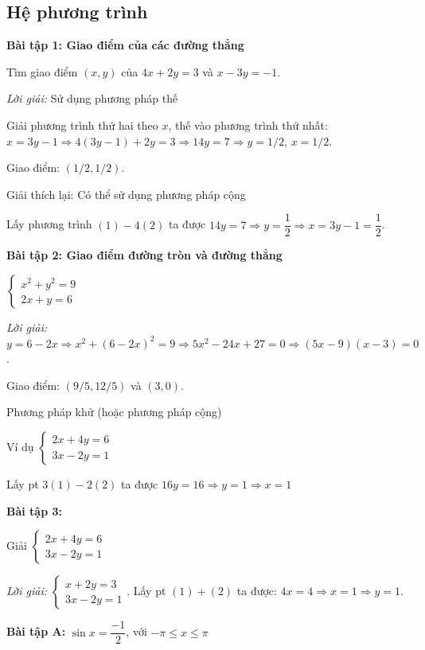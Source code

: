 \documentclass[12pt,a4paper]{article}
\begin{document}
\subsection{Hệ phương trình}

\textbf{Bài tập 1: Giao điểm của các đường thẳng}

Tìm giao điểm $(x,y)$ của $4x + 2y = 3$ và $x - 3y = -1$.

\textit{Lời giải:} Sử dụng phương pháp thế

Giải phương trình thứ hai theo $x$, thế vào phương trình thứ nhất:
$x = 3y - 1 \Rightarrow 4(3y-1) + 2y = 3 \Rightarrow 14y = 7 \Rightarrow y = 1/2$, $x = 1/2$.

Giao điểm: $(1/2, 1/2)$.

Giải thích lại: Có thể sử dụng phương pháp cộng

Lấy phương trình $(1) - 4(2)$ ta được $14y = 7 \Rightarrow y = \dfrac{1}{2} \Rightarrow x = 3y - 1 = \dfrac{1}{2}$.

\textbf{Bài tập 2: Giao điểm đường tròn và đường thẳng}

$\begin{cases} x^2 + y^2 = 9 \\ 2x + y = 6 \end{cases}$

\textit{Lời giải:} $y = 6-2x \Rightarrow x^2 + (6-2x)^2 = 9 \Rightarrow 5x^2 - 24x + 27 = 0 \Rightarrow (5x-9)(x-3) = 0$.

Giao điểm: $(9/5, 12/5)$ và $(3, 0)$.

Phương pháp khử (hoặc phương pháp cộng)

Ví dụ $\begin{cases} 2x + 4y = 6 \\ 3x - 2y = 1 \end{cases}$

Lấy pt $3(1) - 2(2)$ ta được $16y = 16 \Rightarrow y= 1 \Rightarrow x = 1$

\textbf{Bài tập 3:}

Giải $\begin{cases} 2x + 4y = 6 \\ 3x - 2y = 1 \end{cases}$

\textit{Lời giải:} $\begin{cases} x+2y=3 \\ 3x-2y=1 \end{cases}$. Lấy pt $(1) + (2)$ ta được: $4x=4 \Rightarrow x=1 \Rightarrow y=1$.

\textbf{Bài tập A:} $\sin x = \dfrac{-1}{2}$, với $-\pi \le x \le \pi$
\end{document}
